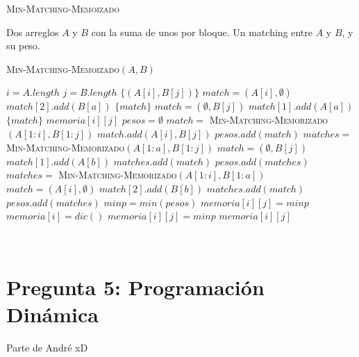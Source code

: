 \documentclass[conference]{IEEEtran}
\begin{document}
\begin{algorithm}
\caption{\textsc{Min-Matching-Memoizado}}
\scriptsize
\begin{algorithmic}
\REQUIRE Dos arreglos $A$ y $B$ con la suma de unos por bloque.
\ENSURE Un matching entre $A$ y $B$, y su peso.
\begin{flushleft}
\textsc{Min-Matching-Memoizado}$(A,B)$
\end{flushleft}
    \STATE $i=A.length$
    \STATE $j=B.length$
        \RETURN $\{(A[i],B[j])\}$
            \STATE $match=(A[i],\emptyset)$
                \STATE $match[2].add(B[a])$
            \ENDFOR
            \RETURN $\{match\}$
        \ELSE
            \STATE $match=(\emptyset,B[j])$
                \STATE $match[1].add(A[a])$
            \ENDFOR
            \RETURN $\{match\}$
        \ENDIF
    \ELSE
                \RETURN $memoria[i][j]$
            \ENDIF
        \ENDIF
        \STATE $pesos=\emptyset$
        \STATE $match=$ \textsc{Min-Matching-Memorizado}$(A[1:i],B[1:j])$
        \STATE $match.add(A[i],B[j])$
        \STATE $pesos.add(match)$
            \STATE $matches=$ \textsc{Min-Matching-Memorizado}$(A[1:a],B[1:j])$
            \STATE $match=(\emptyset,B[j])$
                \STATE $match[1].add(A[b])$
            \ENDFOR
            \STATE $matches.add(match)$
            \STATE $pesos.add(matches)$
        \ENDFOR
            \STATE $matches=$ \textsc{Min-Matching-Memorizado}$(A[1:i],B[1:a])$
            \STATE $match=(A[i],\emptyset)$
                \STATE $match[2].add(B[b])$
            \ENDFOR
            \STATE $matches.add(match)$
            \STATE $pesos.add(matches)$
        \ENDFOR
        \STATE $minp = min(pesos)$
            \STATE $memoria[i][j] = minp$
        \ELSE
            \STATE $memoria[i] = dic()$
            \STATE $memoria[i][j] = minp$
        \ENDIF
        \RETURN $memoria[i][j]$
    \ENDIF
\end{algorithmic}
\label{alg:min-matching-memoizado}
\end{algorithm}
\verb||\\
\section{Pregunta 5: Programación Dinámica}
Parte de André xD
\verb||\\
\end{document}
